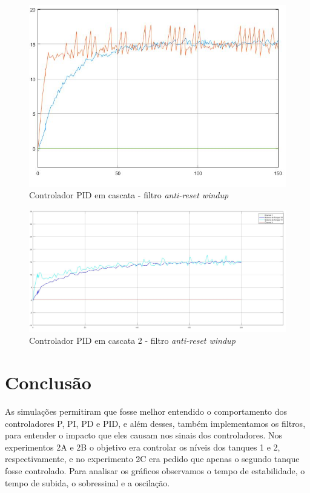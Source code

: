 \documentclass[
	12pt,				%
	openany,			%
	oneside,			%
	a4paper,			%
	english,			%
	french,				%
	spanish,			%
	brazil,				%
	]{abntex2}
\begin{document}
{\begin{figure}[h]
	\centering
	\includegraphics[scale=0.40]{14_controle_cascata_2.jpg}
	\caption{Controlador PID em cascata - filtro \textit{anti-reset windup}}
	\label{fig:controlador_cascata_2}
\end{figure}

\begin{figure}[h]
	\centering
	\includegraphics[scale=0.25]{15_controle_cascata_3.jpg}
	\caption{Controlador PID em cascata 2 - filtro \textit{anti-reset windup}}
	\label{fig:controlador_cascata_3}
\end{figure}

\chapter{Conclusão}

As simulações permitiram que fosse melhor entendido o comportamento dos controladores P, PI, PD e PID, e além desses, também implementamos os filtros, para entender o impacto que eles causam nos sinais dos controladores. Nos experimentos 2A e 2B o objetivo era controlar os níveis dos tanques 1 e 2, respectivamente, e no experimento 2C era pedido que apenas o segundo tanque fosse controlado. Para analisar os gráficos observamos o tempo de estabilidade, o tempo de subida, o sobressinal e a oscilação.

}
\end{document}
